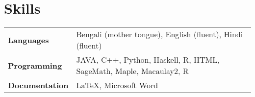 \resumeSubHeadingListEnd














\section{Skills}

\begin{tabular*}{\textwidth}{l @{\hskip 0.5in} l}
\textbf{Languages} & Bengali (mother tongue), English (fluent), Hindi (fluent)\\
\textbf{Programming}  & {JAVA, C++, Python, Haskell, R, HTML, SageMath, Maple, Macaulay2, R} \\
\textbf {Documentation} & {\LaTeX, Microsoft Word} \\
\end{tabular*}









